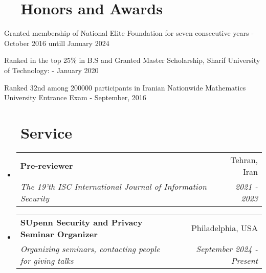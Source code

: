 \documentclass[a4paper,20pt]{article}
\makeatletter
\newcommand{\resumeSubheading}[4]{
  \vspace{-1pt}\item
    \begin{tabular*}{0.97\textwidth}{l@{\extracolsep{\fill}}r}
      \textbf{#1} & #2 \\
      \textit{#3} & \textit{#4} \\
    \end{tabular*}\vspace{-5pt}
}
\newcommand{\resumeSubHeadingListStart}{\begin{itemize}[leftmargin=*]}
\newcommand{\resumeSubHeadingListEnd}{\end{itemize}}
\makeatother
\begin{document}
\vspace{10pt}
\section{~~Honors and Awards}
\begin{description}[font=$\bullet$]
\item {Granted membership of National Elite Foundation for seven consecutive years - October 2016 untill January 2024}
\vspace{-5pt}
\item {Ranked in the top 25\% in B.S and Granted Master Scholarship, Sharif University of Technology: - January 2020 }
\vspace{-5pt}
\item {Ranked 32nd among 200000 participants in Iranian Nationwide Mathematics University Entrance Exam - September, 2016}

\end{description}

\vspace{10pt}
\section{~~Service}
  \resumeSubHeadingListStart
	\resumeSubheading
    {Pre-reviewer}{Tehran, Iran}
    {The 19'th ISC International Journal of Information Security}{2021 - 2023}
\vspace{5pt}
    \resumeSubheading
    {SUpenn Security and Privacy Seminar Organizer}{Philadelphia, USA}
    {Organizing seminars, contacting people for giving talks}{September 2024 - Present}

\resumeSubHeadingListEnd
\end{document}
